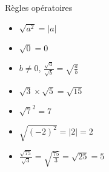 \begin{pageCours}
\begin{ThT}{Règles opératoires}
\begin{minipage}{0.33\linewidth}
\begin{itemize}
\end{itemize}
\end{minipage}
\begin{minipage}{0.33\linewidth}
\begin{itemize}
\item $\sqrt{a ^2} = |a|$
\item $\sqrt{0} = 0$
 
\end{itemize}
\end{minipage}
\begin{minipage}{0.33\linewidth}
\begin{itemize}
\item $b \neq 0$, $\frac{\sqrt{a}}{\sqrt{b}} = \sqrt{  \frac{a}{b} } $ 
\end{itemize}
\end{minipage}

\end{ThT}
 

 
 
\begin{Ex}

\begin{minipage}{0.33\linewidth}
\begin{itemize}
\item $\sqrt 3  \times \sqrt 5 = \sqrt{15}$ 
\item $\sqrt 7^2 = 7$ 

\end{itemize}
\end{minipage}
\begin{minipage}{0.33\linewidth}
\begin{itemize}
\item $\sqrt{(-2)^2} = |2|=2$
\item $\frac{\sqrt{75}}{\sqrt{3}} = \sqrt{  \frac{75}{3} } = \sqrt{ 25 } = 5$ 
\end{itemize}
\end{minipage}

\end{Ex}
 
\end{pageCours} %



